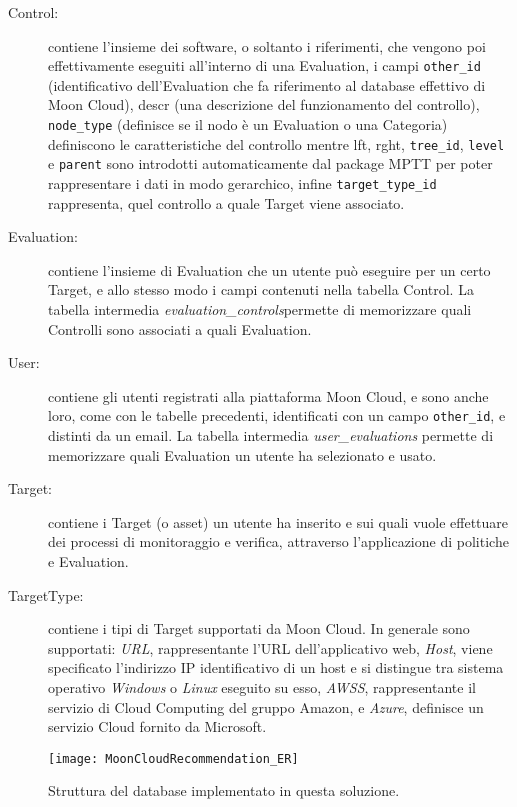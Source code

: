 \begin{description}
    \item[Control:] contiene l'insieme dei software, o soltanto i riferimenti, che vengono poi effettivamente eseguiti all'interno 
    di una Evaluation, i campi \texttt{other\_id} (identificativo dell'Evaluation che fa riferimento al database effettivo di Moon Cloud), 
    descr (una descrizione del funzionamento del controllo), \texttt{node\_type} (definisce se il nodo è un Evaluation o una Categoria) 
    definiscono le caratteristiche del controllo mentre lft, rght, \texttt{tree\_id}, \texttt{level} e \texttt{parent} sono introdotti 
    automaticamente dal package MPTT per poter rappresentare i dati in modo gerarchico, infine \texttt{target\_type\_id} rappresenta, quel 
    controllo a quale Target viene associato.
    \item[Evaluation:] contiene l'insieme di Evaluation che un utente può eseguire per un certo Target, e allo stesso modo 
    i campi contenuti nella tabella Control. La tabella intermedia \textit{evaluation\_controls}permette di memorizzare quali Controlli 
    sono associati a quali Evaluation.
    \item[User:] contiene gli utenti registrati alla piattaforma Moon Cloud, e sono anche loro, come con le tabelle precedenti, 
    identificati con un campo \texttt{other\_id}, e distinti da un email. La tabella intermedia \textit{user\_evaluations} permette di memorizzare 
    quali Evaluation un utente ha selezionato e usato.
    \item[Target:] contiene i Target (o asset) un utente ha inserito e sui quali vuole effettuare dei processi 
    di monitoraggio e verifica, attraverso l'applicazione di politiche e Evaluation.
    \item[TargetType:] contiene i tipi di Target supportati da Moon Cloud. In generale sono supportati: \textit{URL}, 
    rappresentante l'URL dell'applicativo web, \textit{Host}, viene specificato l'indirizzo IP identificativo di un host e si distingue 
    tra sistema operativo \textit{Windows} o \textit{Linux} eseguito su esso, \textit{AWSS}, rappresentante il servizio di Cloud Computing del 
    gruppo Amazon, e \textit{Azure}, definisce un servizio Cloud fornito da Microsoft.
\end{description}
%
\begin{figure}[ht!]
    \centering
    \texttt{[image: MoonCloudRecommendation\_ER]}
    \caption[Struttura del database implementato in questa soluzione]{Struttura del database implementato in questa soluzione.}
    \label{fig:str_db_project}
\end{figure}
%
\newpage
%
